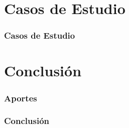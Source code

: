 \documentclass{beamer}
\begin{document}
\section{Casos de Estudio}
\begin{frame}
\frametitle{Casos de Estudio}

\end{frame}


\section{Conclusión}
\begin{frame}
\frametitle{Aportes}

\end{frame}

\begin{frame}
\frametitle{Conclusión}

\end{frame}


\ThankYouFrame
\end{document}
